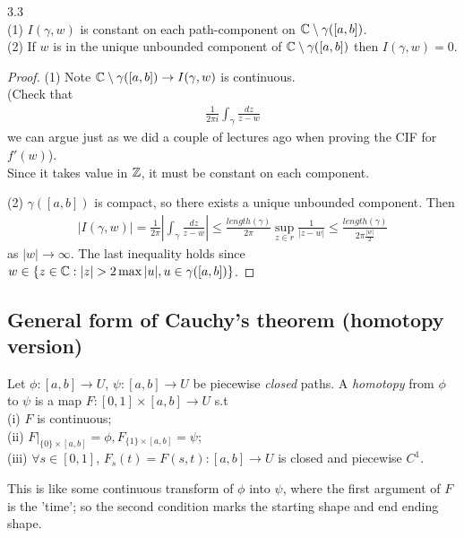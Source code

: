 \documentclass[a4paper]{article}
\begin{document}
\begin{coro} 3.3\\
(1) $I(\gamma,w)$ is constant on each path-component on $\mathbb{C}\setminus \gamma([a,b])$.\\
(2) If $w$ is in the unique unbounded component of $\mathbb{C}\setminus \gamma([a,b])$ then $I(\gamma,w)=0$.
\begin{proof}
(1) Note $\mathbb{C} \setminus \gamma([a,b]) \to I(\gamma,w)$ is continuous.\\ (Check that 
\begin{equation*}
\begin{aligned}
\frac{1}{2\pi i} \int_\gamma \frac{dz}{z-w}
\end{aligned}
\end{equation*}
we can argue just as we did a couple of lectures ago when proving the CIF for $f'(w)$).\\
Since it takes value in $\mathbb{Z}$, it must be constant on each component.

(2) $\gamma([a,b])$ is compact, so there exists a unique unbounded component. Then
\begin{equation*}
\begin{aligned}
|I(\gamma,w)| = \frac{1}{2\pi} \left|\int_\gamma \frac{dz}{z-w}\right| \leq \frac{length(\gamma)}{2\pi} \sup_{z \in r} \frac{1}{|z-w|} \leq \frac{length(\gamma)}{2\pi \frac{|w|}{2}}
\end{aligned}
\end{equation*}
as $|w| \to \infty$. The last inequality holds since $w \in \{z \in \C: |z|>2\max|u|, u \in \gamma([a,b]) \}$.
\end{proof}
\end{coro}

\subsection{General form of Cauchy's theorem (homotopy version)}
\begin{defi}
Let $\phi:[a,b] \to U$, $\psi:[a,b] \to U$ be piecewise \emph{closed} paths. A \emph{homotopy} from $\phi$ to $\psi$ is a map $F:[0,1] \times [a,b] \to U$ s.t\\
(i) $F$ is continuous;\\
(ii) $F|_{\{0\} \times [a,b]} = \phi, F_{\{1\} \times [a,b]} = \psi$;\\
(iii) $\forall s \in [0,1]$, $F_s(t) = F(s,t): [a,b] \to U$ is closed and piecewise $C^1$.

This is like some continuous transform of $\phi$ into $\psi$, where the first argument of $F$ is the 'time'; so the second condition marks the starting shape and end ending shape.
\end{defi}
\end{document}
